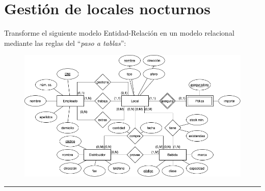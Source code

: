 \documentclass[a4paper]{article}
\begin{document}
\section{Gestión de locales nocturnos}

Transforme el siguiente modelo Entidad-Relación en un modelo relacional mediante las reglas del ``\textit{paso a tablas}'':

\begin{figure}[H]
    \centering
    \includegraphics[width=\textwidth]{figs/gestion-locales-nocturnos}
\end{figure}

\newpage
\vspace{2em}
\hrule
\doclicenseThis
\end{document}

